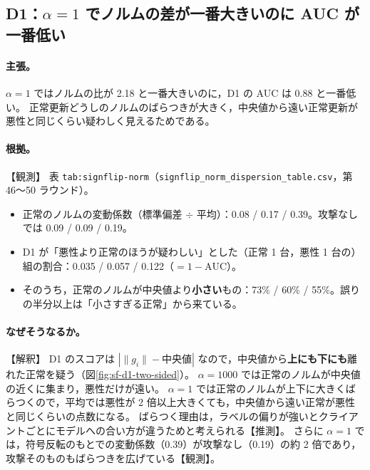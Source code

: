 \documentclass[a4j, dvipdfmx]{jsarticle}  %
\begin{document}
\subsection{D1：$\alpha = 1$ でノルムの差が一番大きいのに AUC が一番低い}
\label{sec:claim-sf-d1alpha}

\paragraph{主張。}
$\alpha = 1$ ではノルムの比が 2.18 と一番大きいのに，D1 の AUC は 0.88 と一番低い。
正常更新どうしのノルムのばらつきが大きく，中央値から遠い正常更新が悪性と同じくらい疑わしく見えるためである。

\paragraph{根拠。}【観測】
表 \texttt{tab:signflip-norm}（\texttt{signflip\_norm\_dispersion\_table.csv}，第 46〜50 ラウンド）。
\begin{itemize}
  \item 正常のノルムの変動係数（標準偏差 $\div$ 平均）：0.08 / 0.17 / 0.39。攻撃なしでは 0.09 / 0.09 / 0.19。
  \item D1 が「悪性より正常のほうが疑わしい」とした（正常 1 台，悪性 1 台の）組の割合：0.035 / 0.057 / 0.122（$= 1 - \mathrm{AUC}$）。
  \item そのうち，正常のノルムが中央値より\textbf{小さい}もの：73\% / 60\% / 55\%。誤りの半分以上は「小さすぎる正常」から来ている。
\end{itemize}

\paragraph{なぜそうなるか。}【解釈】
D1 のスコアは $|\|g_i\| - \mathrm{中央値}|$ なので，中央値から\textbf{上にも下にも}離れた正常を疑う（図\ref{fig:sf-d1-two-sided}）。
$\alpha = 1000$ では正常のノルムが中央値の近くに集まり，悪性だけが遠い。
$\alpha = 1$ では正常のノルムが上下に大きくばらつくので，平均では悪性が 2 倍以上大きくても，中央値から遠い正常が悪性と同じくらいの点数になる。
ばらつく理由は，ラベルの偏りが強いとクライアントごとにモデルへの合い方が違うためと考えられる【推測】。
さらに $\alpha = 1$ では，符号反転のもとでの変動係数（0.39）が攻撃なし（0.19）の約 2 倍であり，攻撃そのものもばらつきを広げている【観測】。
\end{document}
